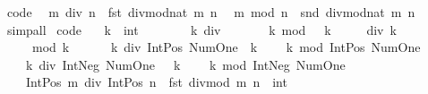 \begin{isabellebody}
\endisatagproof
{\isafoldproof}%
%
\isadelimproof
\isanewline
%
\endisadelimproof
\isanewline
{}\isamarkupfalse%
\ {\isacharbrackleft}{\kern0pt}code{\isacharbrackright}{\kern0pt}{\isacharcolon}{\kern0pt}\isanewline
\ \ {\isachardoublequoteopen}m\ div\ n\ {\isacharequal}{\kern0pt}\ fst\ {\isacharparenleft}{\kern0pt}divmod{\isacharunderscore}{\kern0pt}nat\ m\ n{\isacharparenright}{\kern0pt}{\isachardoublequoteclose}\isanewline
\ \ {\isachardoublequoteopen}m\ mod\ n\ {\isacharequal}{\kern0pt}\ snd\ {\isacharparenleft}{\kern0pt}divmod{\isacharunderscore}{\kern0pt}nat\ m\ n{\isacharparenright}{\kern0pt}{\isachardoublequoteclose}\isanewline
%
\isadelimproof
\ \ %
\endisadelimproof
%
\isatagproof
{}\isamarkupfalse%
\ simp{\isacharunderscore}{\kern0pt}all%
\endisatagproof
{\isafoldproof}%
%
\isadelimproof
\isanewline
%
\endisadelimproof
\isanewline
{}\isamarkupfalse%
\ {\isacharbrackleft}{\kern0pt}code{\isacharbrackright}{\kern0pt}{\isacharcolon}{\kern0pt}\isanewline
\ \ \ k\ {\isacharcolon}{\kern0pt}{\isacharcolon}{\kern0pt}\ int\isanewline
\ \ \ \isanewline
\ \ \ \ {\isachardoublequoteopen}k\ div\ {}\ {\isacharequal}{\kern0pt}\ {}{\isachardoublequoteclose}\isanewline
\ \ \ \ {\isachardoublequoteopen}k\ mod\ {}\ {\isacharequal}{\kern0pt}\ k{\isachardoublequoteclose}\isanewline
\ \ \ \ {\isachardoublequoteopen}{}\ div\ k\ {\isacharequal}{\kern0pt}\ {}{\isachardoublequoteclose}\isanewline
\ \ \ \ {\isachardoublequoteopen}{}\ mod\ k\ {\isacharequal}{\kern0pt}\ {}{\isachardoublequoteclose}\isanewline
\ \ \ \ {\isachardoublequoteopen}k\ div\ Int{\isachardot}{\kern0pt}Pos\ Num{\isachardot}{\kern0pt}One\ {\isacharequal}{\kern0pt}\ k{\isachardoublequoteclose}\isanewline
\ \ \ \ {\isachardoublequoteopen}k\ mod\ Int{\isachardot}{\kern0pt}Pos\ Num{\isachardot}{\kern0pt}One\ {\isacharequal}{\kern0pt}\ {}{\isachardoublequoteclose}\isanewline
\ \ \ \ {\isachardoublequoteopen}k\ div\ Int{\isachardot}{\kern0pt}Neg\ Num{\isachardot}{\kern0pt}One\ {\isacharequal}{\kern0pt}\ {\isacharminus}{\kern0pt}\ k{\isachardoublequoteclose}\isanewline
\ \ \ \ {\isachardoublequoteopen}k\ mod\ Int{\isachardot}{\kern0pt}Neg\ Num{\isachardot}{\kern0pt}One\ {\isacharequal}{\kern0pt}\ {}{\isachardoublequoteclose}\isanewline
\ \ \ \ {\isachardoublequoteopen}Int{\isachardot}{\kern0pt}Pos\ m\ div\ Int{\isachardot}{\kern0pt}Pos\ n\ {\isacharequal}{\kern0pt}\ {\isacharparenleft}{\kern0pt}fst\ {\isacharparenleft}{\kern0pt}divmod\ m\ n{\isacharparenright}{\kern0pt}\ {\isacharcolon}{\kern0pt}{\isacharcolon}{\kern0pt}\ int{\isacharparenright}{\kern0pt}{\isachardoublequoteclose}\isanewline

\end{isabellebody}
